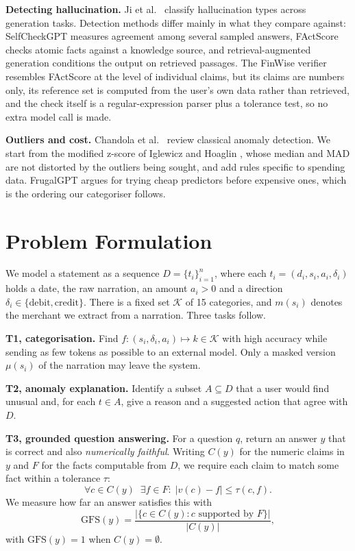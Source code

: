 \documentclass[conference]{IEEEtran}
\begin{document}
\textbf{Detecting hallucination.} Ji et al.\ \cite{ji2023survey} classify hallucination types across generation tasks. Detection methods differ mainly in what they compare against: SelfCheckGPT \cite{manakul2023selfcheck} measures agreement among several sampled answers, FActScore \cite{min2023factscore} checks atomic facts against a knowledge source, and retrieval-augmented generation \cite{lewis2020rag} conditions the output on retrieved passages. The FinWise verifier resembles FActScore at the level of individual claims, but its claims are numbers only, its reference set is computed from the user's own data rather than retrieved, and the check itself is a regular-expression parser plus a tolerance test, so no extra model call is made.

\textbf{Outliers and cost.} Chandola et al.\ \cite{chandola2009anomaly} review classical anomaly detection. We start from the modified z-score of Iglewicz and Hoaglin \cite{iglewicz1993}, whose median and MAD are not distorted by the outliers being sought, and add rules specific to spending data. FrugalGPT \cite{chen2023frugal} argues for trying cheap predictors before expensive ones, which is the ordering our categoriser follows.


\section{Problem Formulation}
We model a statement as a sequence $D=\{t_i\}_{i=1}^{n}$, where each $t_i=(d_i, s_i, a_i, \delta_i)$ holds a date, the raw narration, an amount $a_i>0$ and a direction $\delta_i\in\{\text{debit},\text{credit}\}$. There is a fixed set $\mathcal{K}$ of 15 categories, and $m(s_i)$ denotes the merchant we extract from a narration. Three tasks follow.

\textbf{T1, categorisation.} Find $f: (s_i,\delta_i,a_i)\mapsto k\in\mathcal{K}$ with high accuracy while sending as few tokens as possible to an external model. Only a masked version $\mu(s_i)$ of the narration may leave the system.

\textbf{T2, anomaly explanation.} Identify a subset $A\subseteq D$ that a user would find unusual and, for each $t\in A$, give a reason and a suggested action that agree with $D$.

\textbf{T3, grounded question answering.} For a question $q$, return an answer $y$ that is correct and also \emph{numerically faithful}. Writing $C(y)$ for the numeric claims in $y$ and $F$ for the facts computable from $D$, we require each claim to match some fact within a tolerance $\tau$:
\begin{equation}
\forall c\in C(y)\;\; \exists f\in F:\; \lvert v(c)-f\rvert \le \tau(c,f).
\end{equation}
We measure how far an answer satisfies this with
\begin{equation}
\mathrm{GFS}(y)=\frac{\lvert\{c\in C(y): c \text{ supported by } F\}\rvert}{\lvert C(y)\rvert},
\end{equation}
with $\mathrm{GFS}(y)=1$ when $C(y)=\emptyset$.
\end{document}
